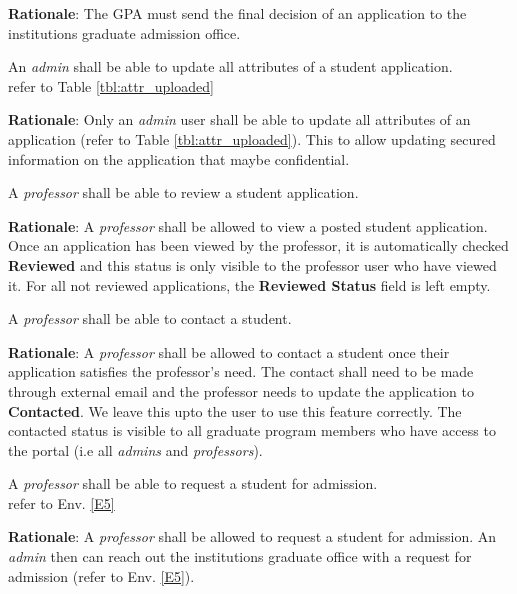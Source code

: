 \documentclass[fontsize=12pt,paper=letter,twoside]{scrartcl}
\begin{document}
\smallskip
\noindent \textbf{Rationale}: The GPA must send the final decision of an application to the institutions graduate admission office.

\rdescription
{An \emph{admin} shall be able to update all attributes of a student application.\\}
{refer to Table \ref{tbl:attr_uploaded}}
\label{R20}

\smallskip
\noindent \textbf{Rationale}: Only an \emph{admin} user shall be able to update all attributes of an application (refer to Table \ref{tbl:attr_uploaded}). This to allow updating secured information on the application that maybe confidential.

\genreq
{A \emph{professor} shall be able to review a student application.\\}
{}
\label{R22}

\smallskip
\noindent \textbf{Rationale}: A \emph{professor} shall be allowed to view a posted student application. Once an application has been viewed by the professor, it is automatically checked \textbf{Reviewed} and this status is only visible to the professor user who have viewed it. For all not reviewed applications, the \textbf{Reviewed Status} field is left empty.

\genreq
{A \emph{professor} shall be able to contact a student.\\}
{}
\label{R23}

\smallskip
\noindent \textbf{Rationale}: A \emph{professor} shall be allowed to contact a student once their application satisfies the professor's need. The contact shall need to be made through external email and the professor needs to update the application to \textbf{Contacted}. We leave this upto the user to use this feature correctly. The contacted status is visible to all graduate program members who have access to the portal (i.e all \emph{admins} and \emph{professors}).

\rdescription
{A \emph{professor} shall be able to request a student for admission.\\}
{refer to Env. \ref{E5}}
\label{R24}

\smallskip
\noindent \textbf{Rationale}: A \emph{professor} shall be allowed to request a student for admission. An \emph{admin} then can reach out the institutions graduate office with a request for admission (refer to Env. \ref{E5}).

\end{document}
